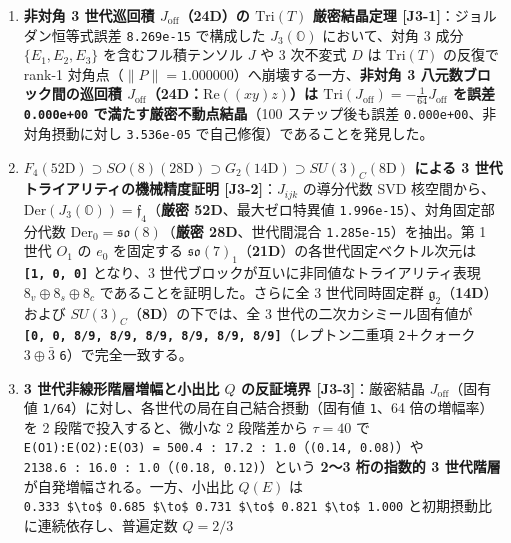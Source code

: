 \documentclass[
  a4paper,
]{ltjsarticle}
\providecommand{\tightlist}{%
  \setlength{\itemsep}{0pt}\setlength{\parskip}{0pt}}
\begin{document}
\begin{enumerate}
\def\labelenumi{\arabic{enumi}.}
\tightlist
\item
  \textbf{非対角 3 世代巡回積 \(J_{\mathrm{off}}\)（24D）の
  \(\mathrm{Tri}(T)\) 厳密結晶定理 {[}J3-1{]}}：ジョルダン恒等式誤差
  \texttt{8.269e-15} で構成した \(J_3(\mathbb{O})\) において、対角 3
  成分 \(\{E_1,E_2,E_3\}\) を含むフル積テンソル \(J\) や 3 次不変式
  \(D\) は \(\mathrm{Tri}(T)\) の反復で rank-1
  対角点（\(\|P\| = 1.000000\)）へ崩壊する一方、\textbf{非対角 3
  八元数ブロック間の巡回積
  \(J_{\mathrm{off}}\)（24D：\(\mathrm{Re}((xy)z)\)）は
  \(\mathrm{Tri}(J_{\mathrm{off}}) = -\frac{1}{64} J_{\mathrm{off}}\)
  を誤差 \texttt{0.000e+00} で満たす厳密不動点結晶}（100
  ステップ後も誤差 \texttt{0.000e+00}、非対角摂動に対し
  \texttt{3.536e-05} で自己修復）であることを発見した。
\item
  \textbf{\(F_4(52\mathrm{D}) \supset SO(8)(28\mathrm{D}) \supset G_2(14\mathrm{D}) \supset SU(3)_C(8\mathrm{D})\)
  による 3 世代トライアリティの機械精度証明 {[}J3-2{]}}：\(J_{ijk}\)
  の導分代数 SVD
  核空間から、\(\mathrm{Der}(J_3(\mathbb{O})) = \mathfrak{f}_4\)（\textbf{厳密
  52D}、最大ゼロ特異値 \texttt{1.996e-15}）、対角固定部分代数
  \(\mathrm{Der}_0 = \mathfrak{so}(8)\)（\textbf{厳密 28D}、世代間混合
  \texttt{1.285e-15}）を抽出。第 1 世代 \(O_1\) の \(e_0\) を固定する
  \(\mathfrak{so}(7)_1\)（\textbf{21D}）の各世代固定ベクトル次元は
  \textbf{\texttt{{[}1,\ 0,\ 0{]}}} となり、3
  世代ブロックが互いに非同値なトライアリティ表現
  \textbf{\(8_v \oplus 8_s \oplus 8_c\)} であることを証明した。さらに全
  3 世代同時固定群 \(\mathfrak{g}_2\)（\textbf{14D}）および
  \(SU(3)_C\)（\textbf{8D}）の下では、全 3 世代の二次カシミール固有値が
  \textbf{\texttt{{[}0,\ 0,\ 8/9,\ 8/9,\ 8/9,\ 8/9,\ 8/9,\ 8/9{]}}}（レプトン二重項
  \texttt{2}＋クォーク \(3\oplus\bar{3}\) \texttt{6}）で完全一致する。
\item
  \textbf{3 世代非線形階層増幅と小出比 \(Q\) の反証境界
  {[}J3-3{]}}：厳密結晶 \(J_{\mathrm{off}}\)（固有値
  \texttt{1/64}）に対し、各世代の局在自己結合摂動（固有値 \texttt{1}、64
  倍の増幅率）を 2 段階で投入すると、微小な 2 段階差から \(\tau = 40\)
  で
  \texttt{E(O1):E(O2):E(O3)\ =\ 500.4\ :\ 17.2\ :\ 1.0}（\texttt{(0.14,\ 0.08)}）や
  \texttt{2138.6\ :\ 16.0\ :\ 1.0}（\texttt{(0.18,\ 0.12)}）という
  \textbf{2〜3 桁の指数的 3 世代階層} が自発増幅される。一方、小出比
  \(Q(E)\) は
  \texttt{0.333\ \$\textbackslash{}to\$\ 0.685\ \$\textbackslash{}to\$\ 0.731\ \$\textbackslash{}to\$\ 0.821\ \$\textbackslash{}to\$\ 1.000}
  と初期摂動比に連続依存し、普遍定数 \(Q = 2/3\)

\end{enumerate}
\end{document}
